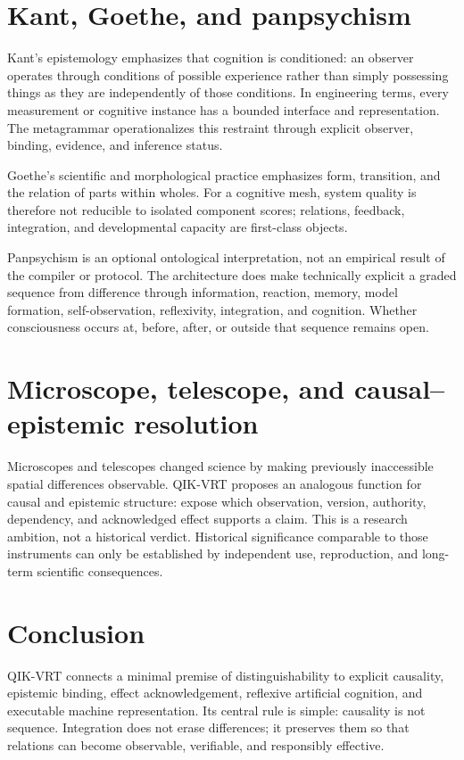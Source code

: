 \documentclass[11pt,a4paper]{article}
\begin{document}
\section{Kant, Goethe, and panpsychism}
Kant's epistemology emphasizes that cognition is conditioned: an observer operates through conditions of possible experience rather than simply possessing things as they are independently of those conditions. In engineering terms, every measurement or cognitive instance has a bounded interface and representation. The metagrammar operationalizes this restraint through explicit observer, binding, evidence, and inference status.

Goethe's scientific and morphological practice emphasizes form, transition, and the relation of parts within wholes. For a cognitive mesh, system quality is therefore not reducible to isolated component scores; relations, feedback, integration, and developmental capacity are first-class objects.

Panpsychism is an optional ontological interpretation, not an empirical result of the compiler or protocol. The architecture does make technically explicit a graded sequence from difference through information, reaction, memory, model formation, self-observation, reflexivity, integration, and cognition. Whether consciousness occurs at, before, after, or outside that sequence remains open.

\section{Microscope, telescope, and causal--epistemic resolution}
Microscopes and telescopes changed science by making previously inaccessible spatial differences observable. QIK-VRT proposes an analogous function for causal and epistemic structure: expose which observation, version, authority, dependency, and acknowledged effect supports a claim. This is a research ambition, not a historical verdict. Historical significance comparable to those instruments can only be established by independent use, reproduction, and long-term scientific consequences.

\section{Conclusion}
QIK-VRT connects a minimal premise of distinguishability to explicit causality, epistemic binding, effect acknowledgement, reflexive artificial cognition, and executable machine representation. Its central rule is simple: causality is not sequence. Integration does not erase differences; it preserves them so that relations can become observable, verifiable, and responsibly effective.
\end{document}
